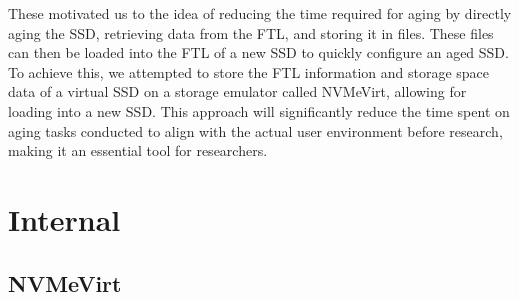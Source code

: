 These motivated us to the idea of reducing the time required for aging by directly aging the SSD, retrieving data from the FTL, and storing it in files.
These files can then be loaded into the FTL of a new SSD to quickly configure an aged SSD.
To achieve this, we attempted to store the FTL information and storage space data of a virtual SSD on a storage emulator called NVMeVirt, allowing for loading into a new SSD.
This approach will significantly reduce the time spent on aging tasks conducted to align with the actual user environment before research, making it an essential tool for researchers.



\section{Internal}\label{s:internal}

\subsection{NVMeVirt}

